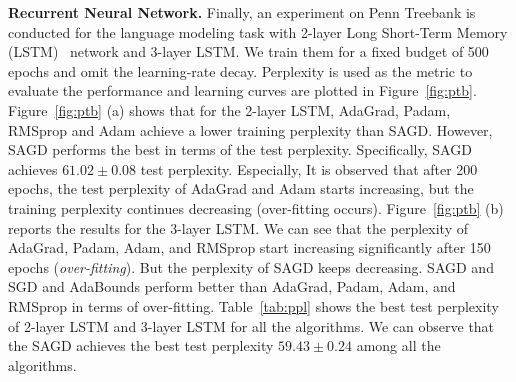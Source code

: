 \documentclass[11pt]{article}
\begin{document}

\textbf{Recurrent Neural Network.}
Finally, an experiment on Penn Treebank is conducted for the language modeling task with 2-layer Long Short-Term Memory (LSTM)~\citep{stni2018} network and 3-layer LSTM. We train them for a fixed budget of 500 epochs and omit the learning-rate decay. Perplexity is used as the metric to evaluate the performance and learning curves are plotted in Figure~\ref{fig:ptb}. 
Figure~\ref{fig:ptb} (a) shows that for the 2-layer LSTM, AdaGrad, Padam, RMSprop and Adam achieve a lower training perplexity than \textsc{SAGD}. However, \textsc{SAGD} performs the best in terms of the test perplexity. Specifically, \textsc{SAGD} achieves $61.02 \pm 0.08$ test perplexity. 
Especially, It is observed that after 200 epochs, the test perplexity of AdaGrad and Adam starts increasing, but the training perplexity continues decreasing (over-fitting occurs).  
Figure~\ref{fig:ptb} (b) reports the results for the 3-layer LSTM. We can see that the perplexity of AdaGrad, Padam, Adam, and RMSprop start increasing significantly after 150 epochs (\emph{over-fitting}). But the perplexity of \textsc{SAGD} keeps decreasing. \textsc{SAGD} and SGD and AdaBounds perform better than AdaGrad, Padam, Adam, and RMSprop in terms of over-fitting.
Table~\ref{tab:ppl} shows the best test perplexity of 2-layer LSTM and 3-layer LSTM for all the algorithms. We can observe that the \textsc{SAGD} achieves the best test perplexity $59.43 \pm 0.24$ among all the algorithms. 
\end{document}

